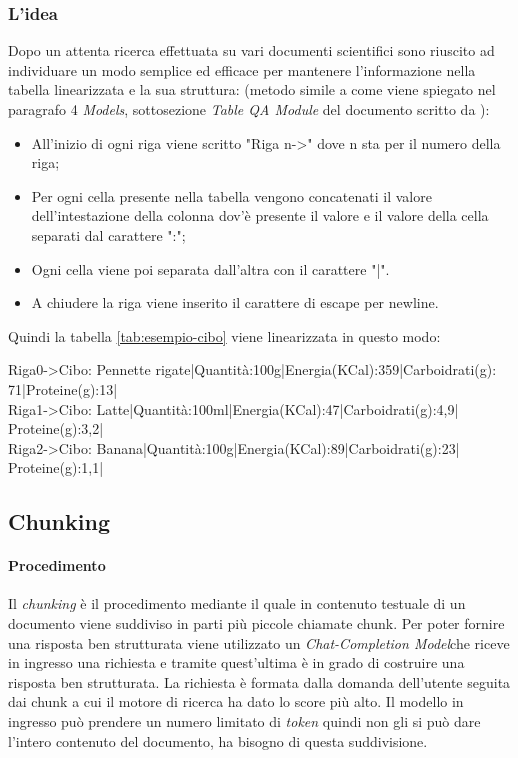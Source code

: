 \subsubsection{L'idea}
\noindent Dopo un attenta ricerca effettuata su vari documenti scientifici sono riuscito ad individuare un modo semplice ed efficace per mantenere 
l'informazione nella tabella linearizzata e la sua struttura: (metodo simile a come viene spiegato nel paragrafo 4 \emph{Models}, sottosezione \emph{Table QA Module} del documento scritto da \cite{art:multimodelqa}):
\begin{itemize}
    \item All'inizio di ogni riga viene scritto "Riga n->" dove n sta per il numero della riga;
    \item Per ogni cella presente nella tabella vengono concatenati il valore dell'intestazione della colonna dov'è presente il valore e il valore della cella separati dal carattere ":";
    \item Ogni cella viene poi separata dall'altra con il carattere "|".
    \item A chiudere la riga viene inserito il carattere di escape per newline.
\end{itemize} 

Quindi la tabella \ref{tab:esempio-cibo} viene linearizzata in questo modo:
\begin{tcolorbox}[colback=white, colframe=black]
    Riga0->Cibo: Pennette rigate|Quantità:100g|Energia(KCal):359|Carboidrati(g): \\
    71|Proteine(g):13| \\
    Riga1->Cibo: Latte|Quantità:100ml|Energia(KCal):47|Carboidrati(g):4,9|\\
    Proteine(g):3,2| \\
    Riga2->Cibo: Banana|Quantità:100g|Energia(KCal):89|Carboidrati(g):23|\\
    Proteine(g):1,1|
\end{tcolorbox}

\subsection{Chunking}
\paragraph{Procedimento}
Il \emph{chunking} è il procedimento mediante il quale in contenuto testuale di un documento viene suddiviso in parti più piccole chiamate chunk.
\noindent Per poter fornire una risposta ben strutturata viene utilizzato un \emph{\gls{Chat-Completion Model}}\glsfirstoccur che riceve in ingresso una richiesta e tramite quest'ultima è in grado di costruire una risposta ben strutturata.
La richiesta è formata dalla domanda dell'utente seguita dai chunk a cui il motore di ricerca ha dato lo score più alto.
Il modello in ingresso può prendere un numero limitato di \emph{token} quindi non gli si può dare l'intero contenuto del documento, ha bisogno di questa suddivisione.

